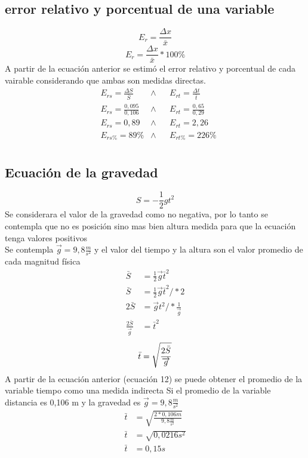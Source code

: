\documentclass[runningheads]{llncs}
\begin{document}
\subsection*{error relativo y porcentual de una variable}
    \begin{equation}
        E_{r}=\frac{\Delta x}{\bar{x}}
    \end{equation}
    \begin{equation}
        E_{r}=\frac{\Delta x}{\bar{x}}*100\%
    \end{equation}
    A partir de la ecuación anterior se estimó el error relativo y porcentual de cada vairable considerando que ambas son medidas directas. 
    \begin{align*}
        &E_{rs}=\frac{\Delta S}{\bar{S}}
        &\wedge&
        &E_{rt}=\frac{\Delta t}{\bar{t}}\\
        &E_{rs}=\frac{0,095}{0,106}
        &\wedge&
        &E_{rt}=\frac{0,65}{0,29}\\
        &E_{rs}=0,89
        &\wedge&
        &E_{rt}=2,26 \tag{G}\\
        &E_{rs\%}=89\% 
        &\wedge&
        &E_{rt\%}=226\% \tag{H}\\
    \end{align*}
\subsection*{Ecuación de la gravedad}
    \begin{equation}
        S =-\frac{1}{2}gt^{2}
    \end{equation}
    Se considerara el valor de la gravedad como no negativa, por lo tanto se contempla que no es posición sino mas bien altura medida para que la ecuación tenga valores positivos\\
    Se contempla $\vec{g}=9,8 \frac{m}{{s}^{2}}$ y el valor del tiempo y la altura son el valor promedio de cada magnitud física \\
    \begin{align*}
        \bar{S} & =\frac{1}{2}\overrightarrow{g}\bar{t}^{2}\\
        \bar{S} & =\frac{1}{2}\overrightarrow{g}\bar{t}^{2} / *2\\
        2\bar{S}& =\overrightarrow{g}t^{2}/ *\frac{1}{\overrightarrow{g}}\\  
        \frac{2\bar{S}}{\overrightarrow{g}} & =\bar{t}^{2}
    \end{align*}
    \begin{equation}
        \bar{t}=\sqrt{\frac{2\bar{S}}{\overrightarrow{g}}}\\
    \end{equation}    
    A partir de la ecuación anterior (ecuación 12) se puede obtener el promedio de la variable tiempo como una medida indirecta
    Si el promedio de la variable distancia es 0,106 m y la gravedad es $\overrightarrow{g}=9,8 \frac{m}{s^{2}}$
    \begin{align*}
        \bar{t}&=\sqrt{\frac{2*0,106 m}{9,8\frac{m}{s^{2}}}}\\
        \bar{t}&=\sqrt{0,0216 s^{2}}\\
        \bar{t}&=0,15 s\tag{I}\\
    \end{align*}
\end{document}
